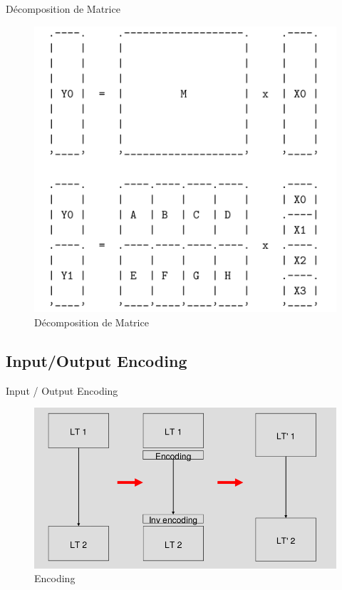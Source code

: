 \documentclass{beamer}
\begin{document}
\begin{frame}{Décomposition de Matrice}
\begin{figure}[h]
\centering
\includegraphics[scale=0.50]{images/decompo_matrice.png}
\caption{Décomposition de Matrice}
\label{fig:keygen}
\end{figure}
\end{frame}

\subsection{Input/Output Encoding}

\begin{frame}{Input / Output Encoding}
\begin{figure}[h]
\centering
\includegraphics[scale=0.5]{images/encoding.png}
\caption{Encoding}
\label{fig:keygen}
\end{figure}
\end{frame}
\end{document}
